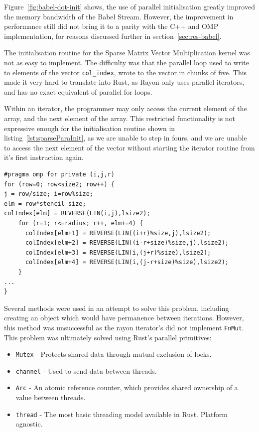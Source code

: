 Figure~\ref{fig:babel-dot-init} shows, the use of parallel initialisation greatly improved the memory bandwidth of the Babel Stream. However, the improvement in performance still did not bring it to a parity with the C++ and OMP implementation, for reasons discussed further in section~\ref{sec:res-babel}.

The initialisation routine for the Sparse Matrix Vector Multiplication kernel was not as easy to implement. The difficulty was that the parallel loop used to write to elements of the vector \texttt{col\_index}, wrote to the vector in chunks of five. This made it very hard to translate into Rust, as Rayon only uses parallel iterators, and has no exact equivalent of parallel for loops.

Within an iterator, the programmer may only access the current element of the array, and the next element of the array. This restricted functionality is not expressive enough for the initialisation routine shown in listing~\ref{lst:sparseParaInit}, as we are unable to step in fours, and we are unable to access the next element of the vector without starting the iterator routine from it's first instruction again.


\begin{code}
\begin{verbatim}
#pragma omp for private (i,j,r)
for (row=0; row<size2; row++) {
j = row/size; i=row%size;
elm = row*stencil_size;
colIndex[elm] = REVERSE(LIN(i,j),lsize2);
    for (r=1; r<=radius; r++, elm+=4) {
      colIndex[elm+1] = REVERSE(LIN((i+r)%size,j),lsize2);
      colIndex[elm+2] = REVERSE(LIN((i-r+size)%size,j),lsize2);
      colIndex[elm+3] = REVERSE(LIN(i,(j+r)%size),lsize2);
      colIndex[elm+4] = REVERSE(LIN(i,(j-r+size)%size),lsize2);
    }
...
}
\end{verbatim}
\label{lst:sparseParaInit}
\end{code}

Several methods were used in an attempt to solve this problem, including creating an object which would have permanence between iterations. However, this method was unsuccessful as the rayon iterator's did not implement \texttt{FnMut}. This problem was ultimately solved using Rust's parallel primitives:

\begin{itemize}
    \item \texttt{Mutex} - Protects shared data through mutual exclusion of locks.
    \item \texttt{channel} - Used to send data between threads.
    \item \texttt{Arc} - An atomic reference counter, which provides shared ownership of a value between threads.
    \item \texttt{thread} - The most basic threading model available in Rust. Platform agnostic.
\end{itemize}

